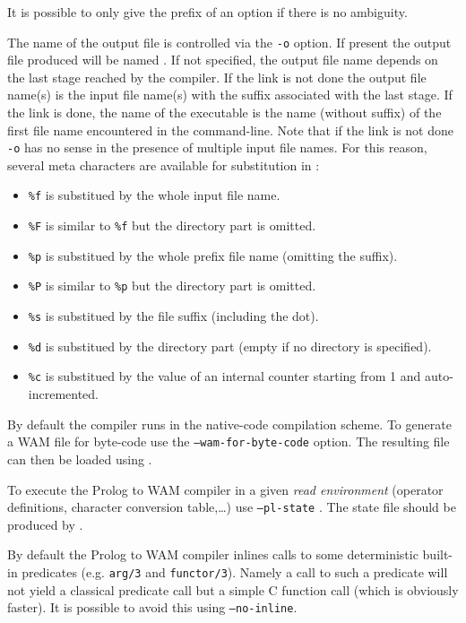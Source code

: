 It is possible to only give the prefix of an option if there is no ambiguity.

The name of the output file is controlled via the \texttt{-o}
 option. If present the output file produced will be
named . If not specified, the output file name depends on the
last stage reached by the compiler. If the link is not done the output file
name(s) is the input file name(s) with the suffix associated with the last
stage. If the link is done, the name of the executable is the name (without
suffix) of the first file name encountered in the command-line.  Note that if
the link is not done \texttt{-o} has no sense in the presence of multiple
input file names. For this reason, several meta characters are available for substitution in :

\begin{itemize}
\item \texttt{\%f} is substitued by the whole input file name.
\item \texttt{\%F} is similar to \texttt{\%f} but the directory part is omitted.
\item \texttt{\%p} is substitued by the whole prefix file name (omitting the suffix).
\item \texttt{\%P} is similar to \texttt{\%p} but the directory part is omitted.
\item \texttt{\%s} is substitued by the file suffix (including the dot).
\item \texttt{\%d} is substitued by the directory part (empty if no directory is specified).
\item \texttt{\%c} is substitued by the value of an internal counter starting from 1 and auto-incremented.
\end{itemize}

By default the compiler runs in the native-code compilation scheme. To
generate a WAM file for byte-code use the \texttt{--wam-for-byte-code}
option. The resulting file can then be loaded using 
.

To execute the Prolog to WAM compiler in a given \emph{read environment}
(operator definitions, character conversion table,\ldots) use
\texttt{--pl-state} . The state file should be
produced by 
.

By default the Prolog to WAM compiler inlines calls to some deterministic
built-in predicates (e.g. \texttt{arg/3} and \texttt{functor/3}). Namely a
call to such a predicate will not yield a classical predicate call but a
simple C function call (which is obviously faster). It is possible to avoid
this using \texttt{--no-inline}.

